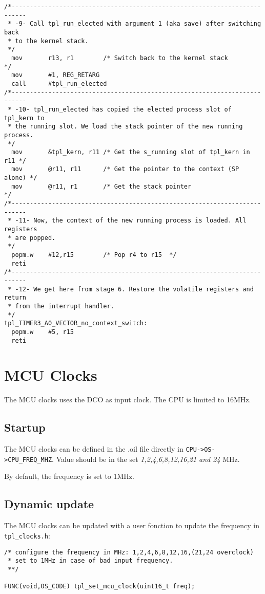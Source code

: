 \documentclass[11pt, oneside]{article}   	%
\begin{document}
\begin{lstlisting}[basicstyle=\footnotesize\ttfamily]
/*--------------------------------------------------------------------------
 * -9- Call tpl_run_elected with argument 1 (aka save) after switching back
 * to the kernel stack.
 */
  mov       r13, r1        /* Switch back to the kernel stack           */
  mov       #1, REG_RETARG
  call      #tpl_run_elected
/*--------------------------------------------------------------------------
 * -10- tpl_run_elected has copied the elected process slot of tpl_kern to
 * the running slot. We load the stack pointer of the new running process.
 */
  mov       &tpl_kern, r11 /* Get the s_running slot of tpl_kern in r11 */
  mov       @r11, r11      /* Get the pointer to the context (SP alone) */
  mov       @r11, r1       /* Get the stack pointer                     */
/*--------------------------------------------------------------------------
 * -11- Now, the context of the new running process is loaded. All registers
 * are popped.
 */
  popm.w    #12,r15        /* Pop r4 to r15  */
  reti
/*--------------------------------------------------------------------------
 * -12- We get here from stage 6. Restore the volatile registers and return
 * from the interrupt handler.
 */
tpl_TIMER3_A0_VECTOR_no_context_switch:
  popm.w    #5, r15
  reti
\end{lstlisting}

\section{MCU Clocks}
The MCU clocks uses the DCO as input clock. The CPU is limited to 16MHz. 

\subsection{Startup}
The MCU clocks can be defined in the .oil file directly in \texttt{CPU->OS->CPU\_FREQ\_MHZ}. Value should be in the set \emph{1,2,4,6,8,12,16,21 and 24} MHz.

By default, the frequency is set to 1MHz.

\subsection{Dynamic update}
The MCU clocks can be updated with a user fonction to update the frequency in \lstinline{tpl_clocks.h}:

\begin{lstlisting}
/* configure the frequency in MHz: 1,2,4,6,8,12,16,(21,24 overclock)
 * set to 1MHz in case of bad input frequency.
 **/

FUNC(void,OS_CODE) tpl_set_mcu_clock(uint16_t freq);
\end{lstlisting}
\end{document}
